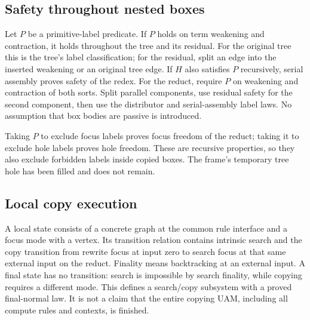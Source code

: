 



\subsection{Safety throughout nested boxes}

Let $P$ be a primitive-label predicate. If $P$ holds on term weakening and
contraction, it holds throughout the tree and its residual. For the original
tree this is the tree's label classification; for the residual, split an
edge into the inserted weakening or an original tree edge. If $H$ also
satisfies $P$ recursively, serial assembly proves safety of the redex.
For the reduct, require $P$ on weakening and contraction of both sorts.
Split parallel components, use residual safety for the second component,
then use the distributor and serial-assembly label laws. No assumption that
box bodies are passive is introduced.





Taking $P$ to exclude focus labels proves focus freedom of the reduct;
taking it to exclude hole labels proves hole freedom. These are recursive
properties, so they also exclude forbidden labels inside copied boxes.
The frame's temporary tree hole has been filled and does not remain.



\subsection{Local copy execution}

A local state consists of a concrete graph at the common rule interface and
a focus mode with a vertex. Its transition relation contains intrinsic
search and the copy transition from rewrite focus at input zero to search
focus at that same external input on the reduct. Finality means backtracking
at an external input. A final state has no transition: search is impossible
by search finality, while copying requires a different mode. This defines a
search/copy subsystem with a proved final-normal law. It is not a claim that
the entire copying UAM, including all compute rules and contexts, is finished.

